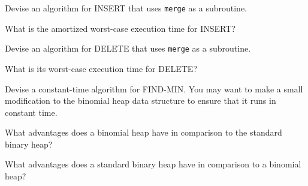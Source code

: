 \documentclass{tufte-handout}
\begin{document}
\begin{questions}
Devise an algorithm for INSERT that uses \verb|merge| as a subroutine. 

\item What is the amortized worst-case execution time for INSERT?

\item Devise an algorithm for DELETE that uses \verb|merge| as a subroutine. 

\item What is its worst-case execution time for DELETE?

\item Devise a constant-time algorithm for FIND-MIN. You may want to make a small modification to the binomial heap data structure to ensure that it runs in constant time.

\item What advantages does a binomial heap have in comparison to the standard binary heap?

\item What advantages does a standard binary heap have in comparison to a binomial heap?

\end{questions}
\end{document}
